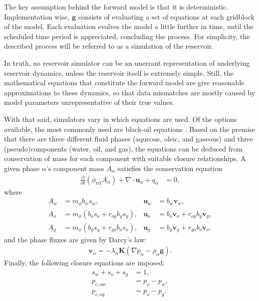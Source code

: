 The key assumption behind the forward model is that it is deterministic. 
Implementation wise, $\mathbf{g}$ consists of evaluating a set of equations 
at each gridblock of the model.
%
Each evaluation evolves the model a little further in time, 
until the scheduled time period is appreciated, concluding the process.
%
For simplicity, the described process will be referred to as a simulation of the reservoir.

In truth, no reservoir simulator can be an unerrant representation of underlying reservoir dynamics, 
unless the reservoir itself is extremely simple.
%
Still, the mathematical equations that constitute the forward model are give reasonable approximations to these dynamics,
so that data mismatches are mostly caused by model parameters unrepresentative of their true values.

With that said, simulators vary in which equations are used.
Of the options available, the most commonly used are black-oil equations
\cite{Rasmussen:2021}.
Based on the premise that there are three different fluid phases (aqueous, oleic, and gaseous) 
and three (pseudo)components (water, oil, and gas),
the equations can be deduced from conservation of mass for each component with suitable closure relationships. 
%
A given phase $\alpha$'s component mass $A_\alpha$ satisfies the conservation equation
%
\begin{align}
    \frac{\partial}{\partial t} \left(\phi_{\text{ref}} A_\alpha \right)
    + \nabla \cdot \mathbf{u}_\alpha + q_\alpha & = 0,
\label{eq:materialbalance-cont}
\end{align}
%
where 
%
\begin{subequations}
\label{eq:acc}
\begin{align}
  A_w &= m_{\phi} b_{w} s_{w},                          & \mathbf{u}_w &= b_{w} \mathbf{v}_{w}, \\
  A_o &= m_{\phi} (b_{o} s_{o} + r_{og}b_{g}s_{g}), & \mathbf{u}_o &= b_{o} \mathbf{v}_{o} +
r_{og}b_{g}\mathbf{v}_{g}, \\
  A_g &= m_{\phi} (b_{g} s_{g} + r_{go}b_{o}s_{o}), & \mathbf{u}_g &= b_{g} \mathbf{v}_{g} +
r_{go}b_{o}\mathbf{v}_{o}.
\end{align}
\end{subequations}
%
and the phase fluxes are given by Darcy's law:
%
\begin{align}
    \mathbf{v}_\alpha = -\lambda_\alpha \mathbf{K} (\nabla p_\alpha - \rho_\alpha \mathbf{g}).
    \label{eq:Darcy-mph}
\end{align}
%
Finally, the following closure equations are imposed:
%
\begin{align}
    s_w + s_o + s_g &= 1, \label{eq:fluids-fill-porevolume} \\
    p_{c,ow} & = p_{o} - p_{w}, \label{eq:oil-water-capillary} \\
    p_{c,og} & = p_{o} - p_{g}. \label{eq:oil-gas-capillary}
\end{align} 

